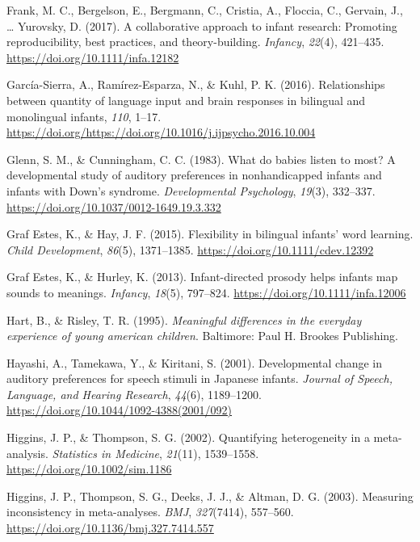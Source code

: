 \documentclass[english,,man,floatsintext]{apa6}
\begin{document}
\leavevmode\hypertarget{ref-frank_2017}{}%
Frank, M. C., Bergelson, E., Bergmann, C., Cristia, A., Floccia, C., Gervain, J., \ldots{} Yurovsky, D. (2017). A collaborative approach to infant research: Promoting reproducibility, best practices, and theory-building. \emph{Infancy}, \emph{22}(4), 421--435. \url{https://doi.org/10.1111/infa.12182}

\leavevmode\hypertarget{ref-garcia_sierra_2016}{}%
García-Sierra, A., Ramírez-Esparza, N., \& Kuhl, P. K. (2016). Relationships between quantity of language input and brain responses in bilingual and monolingual infants, \emph{110}, 1--17. \url{https://doi.org/https://doi.org/10.1016/j.ijpsycho.2016.10.004}

\leavevmode\hypertarget{ref-glenn_1983}{}%
Glenn, S. M., \& Cunningham, C. C. (1983). What do babies listen to most? A developmental study of auditory preferences in nonhandicapped infants and infants with Down's syndrome. \emph{Developmental Psychology}, \emph{19}(3), 332--337. \url{https://doi.org/10.1037/0012-1649.19.3.332}

\leavevmode\hypertarget{ref-graf_estes_2015}{}%
Graf Estes, K., \& Hay, J. F. (2015). Flexibility in bilingual infants' word learning. \emph{Child Development}, \emph{86}(5), 1371--1385. \url{https://doi.org/10.1111/cdev.12392}

\leavevmode\hypertarget{ref-graf_estes_2013}{}%
Graf Estes, K., \& Hurley, K. (2013). Infant-directed prosody helps infants map sounds to meanings. \emph{Infancy}, \emph{18}(5), 797--824. \url{https://doi.org/10.1111/infa.12006}

\leavevmode\hypertarget{ref-hart_1995}{}%
Hart, B., \& Risley, T. R. (1995). \emph{Meaningful differences in the everyday experience of young american children}. Baltimore: Paul H. Brookes Publishing.

\leavevmode\hypertarget{ref-hayashi_2001}{}%
Hayashi, A., Tamekawa, Y., \& Kiritani, S. (2001). Developmental change in auditory preferences for speech stimuli in Japanese infants. \emph{Journal of Speech, Language, and Hearing Research}, \emph{44}(6), 1189--1200. \url{https://doi.org/10.1044/1092-4388(2001/092)}

\leavevmode\hypertarget{ref-higgins_2002}{}%
Higgins, J. P., \& Thompson, S. G. (2002). Quantifying heterogeneity in a meta-analysis. \emph{Statistics in Medicine}, \emph{21}(11), 1539--1558. \url{https://doi.org/10.1002/sim.1186}

\leavevmode\hypertarget{ref-higgins_2003}{}%
Higgins, J. P., Thompson, S. G., Deeks, J. J., \& Altman, D. G. (2003). Measuring inconsistency in meta-analyses. \emph{BMJ}, \emph{327}(7414), 557--560. \url{https://doi.org/10.1136/bmj.327.7414.557}
\end{document}
